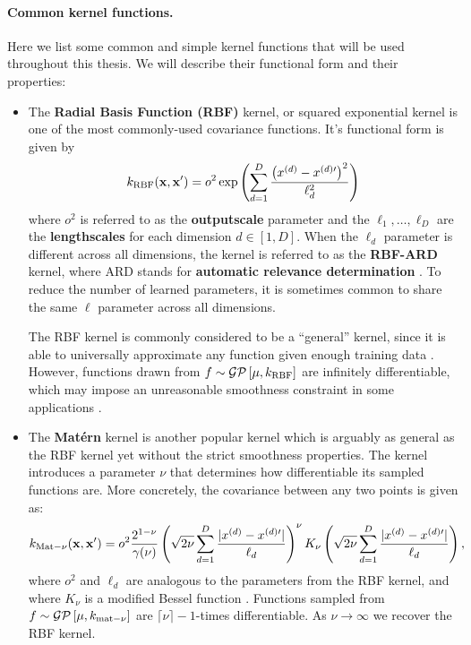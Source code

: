 \paragraph{Common kernel functions.}
Here we list some common and simple kernel functions that will be used throughout this thesis.
We will describe their functional form and their properties:
%
\begin{itemize}
  \item The {\bf Radial Basis Function (RBF)} kernel, or squared exponential kernel is one of the most commonly-used covariance functions.
    It's functional form is given by
    \[ k_\text{RBF}(\mathbf{x}, \mathbf{x}') = o^2 \exp \left( \sum_{d=1}^D \frac{\left( x^{(d)} - x^{(d)\prime} \right)^2}{\ell_d^2}  \right) \]
    where $o^2$ is referred to as the {\bf outputscale} parameter and the $\ell_1, \ldots, \ell_D$ are the {\bf lengthscales} for each dimension $d \in [1, D]$.
    When the $\ell_d$ parameter is different across all dimensions, the kernel is referred to as the {\bf RBF-ARD } kernel, where ARD stands for {\bf automatic relevance determination }.
    To reduce the number of learned parameters, it is sometimes common to share the same $\ell$ parameter across all dimensions.

    The RBF kernel is commonly considered to be a ``general'' kernel, since it is able to universally approximate any function given enough training data \cite{micchelli2006universal}.
		However, functions drawn from $f \sim \mathcal{GP} \left[ \mu, k_\text{RBF} \right]$ are infinitely differentiable, which may impose an unreasonable smoothness constraint in some applications \cite{stein2012interpolation}.

	\item The {\bf Mat\'{e}rn} kernel is another popular kernel which is arguably as general as the RBF kernel yet without the strict smoothness properties.
		The kernel introduces a parameter $\nu$ that determines how differentiable its sampled functions are.
		More concretely, the covariance between any two points is given as:
    \[
			k_{\text{Mat}-\nu} (\mathbf{x}, \mathbf{x}') = o^2 \frac{2^{1 - \nu}}{\gamma(\nu)}
			\left( \sqrt{2 \nu} \sum_{d=1}^D \frac{\vert x^{(d)} - x^{(d)\prime} \vert}{\ell_d}  \right)^\nu
			K_\nu \left( \sqrt{2 \nu} \sum_{d=1}^D \frac{\vert x^{(d)} - x^{(d)\prime} \vert}{\ell_d}  \right),
		\]
    where $o^2$ and $\ell_d$ are analogous to the parameters from the RBF kernel, and where $K_\nu$ is a modified Bessel function \cite{rasmussen2006gaussian}.
    Functions sampled from $f \sim \mathcal{GP} \left[ \mu, k_{\text{mat}-\nu} \right]$ are $\lceil \nu \rceil - 1$-times differentiable.
    As $\nu \rightarrow \infty$ we recover the RBF kernel.


\end{itemize}
